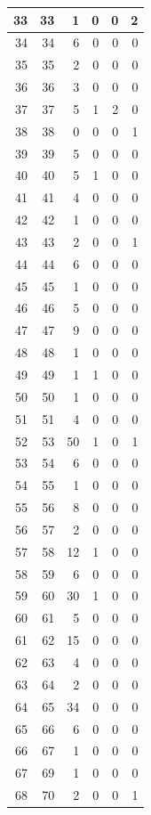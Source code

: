\documentclass[
  letterpaper,
  DIV=11,
  numbers=noendperiod]{scrreprt}
\begin{document}
\begin{tabular}{r|r|r|r|r|r}
\hline
33 & 33 & 1 & 0 & 0 & 2\\
\hline
34 & 34 & 6 & 0 & 0 & 0\\
\hline
35 & 35 & 2 & 0 & 0 & 0\\
\hline
36 & 36 & 3 & 0 & 0 & 0\\
\hline
37 & 37 & 5 & 1 & 2 & 0\\
\hline
38 & 38 & 0 & 0 & 0 & 1\\
\hline
39 & 39 & 5 & 0 & 0 & 0\\
\hline
40 & 40 & 5 & 1 & 0 & 0\\
\hline
41 & 41 & 4 & 0 & 0 & 0\\
\hline
42 & 42 & 1 & 0 & 0 & 0\\
\hline
43 & 43 & 2 & 0 & 0 & 1\\
\hline
44 & 44 & 6 & 0 & 0 & 0\\
\hline
45 & 45 & 1 & 0 & 0 & 0\\
\hline
46 & 46 & 5 & 0 & 0 & 0\\
\hline
47 & 47 & 9 & 0 & 0 & 0\\
\hline
48 & 48 & 1 & 0 & 0 & 0\\
\hline
49 & 49 & 1 & 1 & 0 & 0\\
\hline
50 & 50 & 1 & 0 & 0 & 0\\
\hline
51 & 51 & 4 & 0 & 0 & 0\\
\hline
52 & 53 & 50 & 1 & 0 & 1\\
\hline
53 & 54 & 6 & 0 & 0 & 0\\
\hline
54 & 55 & 1 & 0 & 0 & 0\\
\hline
55 & 56 & 8 & 0 & 0 & 0\\
\hline
56 & 57 & 2 & 0 & 0 & 0\\
\hline
57 & 58 & 12 & 1 & 0 & 0\\
\hline
58 & 59 & 6 & 0 & 0 & 0\\
\hline
59 & 60 & 30 & 1 & 0 & 0\\
\hline
60 & 61 & 5 & 0 & 0 & 0\\
\hline
61 & 62 & 15 & 0 & 0 & 0\\
\hline
62 & 63 & 4 & 0 & 0 & 0\\
\hline
63 & 64 & 2 & 0 & 0 & 0\\
\hline
64 & 65 & 34 & 0 & 0 & 0\\
\hline
65 & 66 & 6 & 0 & 0 & 0\\
\hline
66 & 67 & 1 & 0 & 0 & 0\\
\hline
67 & 69 & 1 & 0 & 0 & 0\\
\hline
68 & 70 & 2 & 0 & 0 & 1\\

\end{tabular}
\end{document}
